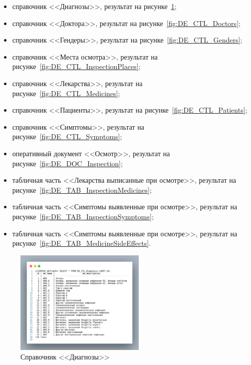 \begin{itemize}
  \item справочник <<Диагнозы>>, результат на рисунке~\ref{fig:DE_CTL_Diagnosis};
  \item справочник <<Доктора>>, результат на рисунке~\ref{fig:DE_CTL_Doctors};
  \item справочник <<Гендеры>>, результат на рисунке~\ref{fig:DE_CTL_Genders};
  \item справочник <<Места осмотра>>, результат на рисунке~\ref{fig:DE_CTL_InspectionPlaces};
  \item справочник <<Лекарства>>, результат на рисунке~\ref{fig:DE_CTL_Medicines};
  \item справочник <<Пациенты>>, результат на рисунке~\ref{fig:DE_CTL_Patients};
  \item справочник <<Симптомы>>, результат на рисунке~\ref{fig:DE_CTL_Symptoms};
  \item оперативный документ <<Осмотр>>, результат на рисунке~\ref{fig:DE_DOC_Inspection};
  \item табличная часть <<Лекарства выписанные при осмотре>>, результат на рисунке~\ref{fig:DE_TAB_InspectionMedicines};
  \item табличная часть <<Симптомы выявленные при осмотре>>, результат на рисунке~\ref{fig:DE_TAB_InspectionSymptoms};
  \item табличная часть <<Симптомы выявленные при осмотре>>, результат на рисунке~\ref{fig:DE_TAB_MedicineSideEffects}.
\end{itemize}

\begin{figure}[p!h]
  \centering

  \includegraphics[height=5cm]
  {inc/DE_CTL_Diagnosis.png}

  \caption{Справочник <<Диагнозы>>}

  \label{fig:DE_CTL_Diagnosis}
\end{figure}

